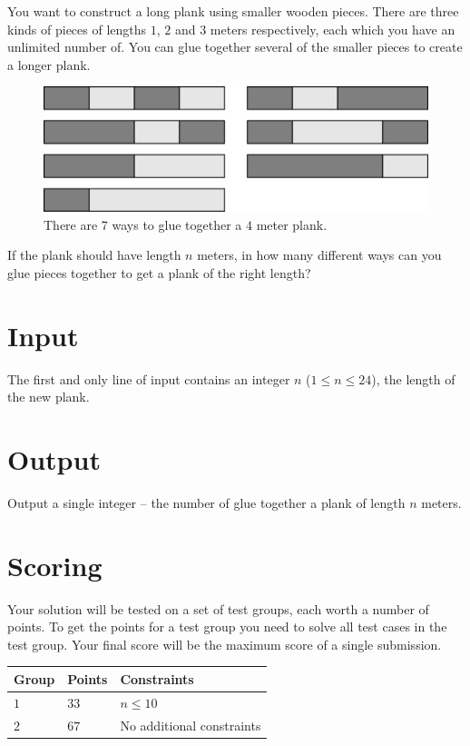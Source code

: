 You want to construct a long plank using smaller wooden pieces.
There are three kinds of pieces of lengths $1$, $2$ and $3$ meters respectively, each which you have an unlimited number of.
You can glue together several of the smaller pieces to create a longer plank.

\begin{figure}[h]
    \centering
    \includegraphics{plank.png}
    \caption{There are $7$ ways to glue together a $4$ meter plank.}
\end{figure}

If the plank should have length $n$ meters, in how many different ways can you glue pieces together to get a plank of the right length?

\section*{Input}
The first and only line of input contains an integer $n$ ($1 \le n \le 24$), the length of the new plank.

\section*{Output}
Output a single integer -- the number of glue together a plank of length $n$ meters.

\section*{Scoring}
Your solution will be tested on a set of test groups, each worth a number of points.
To get the points for a test group you need to solve all test cases in the test group. Your final score will be the maximum score of a single submission.

\noindent
\begin{tabular}{| l | l | l |}
  \hline
  Group & Points & Constraints \\ \hline
  $1$    & $33$        &  $n \le 10$ \\ \hline
  $2$    & $67$        &  No additional constraints \\ \hline
\end{tabular}
